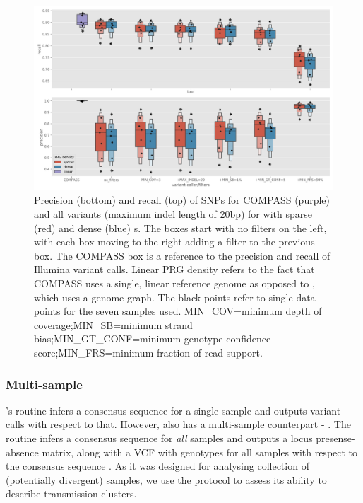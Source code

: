 \begin{figure}
\begin{center}
\includegraphics[width=0.90\columnwidth]{Chapter2/Figs/pandora-precision-recall-filters-all-variants.png}
\caption{{Precision (bottom) and recall (top) of SNPs for COMPASS (purple) and all variants (maximum indel length of 20bp) for \pandora{} with sparse (red) and dense (blue) \prg{}s. The \pandora{} boxes start with no filters on the left, with each box moving to the right adding a filter to the previous box. The COMPASS box is a reference to the precision and recall of Illumina variant calls. Linear PRG density refers to the fact that COMPASS uses a single, linear reference genome as opposed to \pandora{}, which uses a genome graph. The black points refer to single data points for the seven samples used. MIN\_COV=minimum depth of coverage;MIN\_SB=minimum strand bias;MIN\_GT\_CONF=minimum genotype confidence score;MIN\_FRS=minimum fraction of read support.
{\label{fig:pandora-filters-all}}%
}}
\end{center}
\end{figure}

\subsubsection{Multi-sample}

\pandora{}'s  routine infers a consensus sequence for a single sample and outputs variant calls with respect to that. However, \pandora{} also has a multi-sample counterpart - . The  routine infers a consensus sequence for \emph{all} samples and outputs a locus presense-absence matrix, along with a VCF with genotypes for all samples with respect to the consensus sequence . As it was designed for analysing collection of (potentially divergent) samples, we use the  protocol to assess its ability to describe transmission clusters. 

